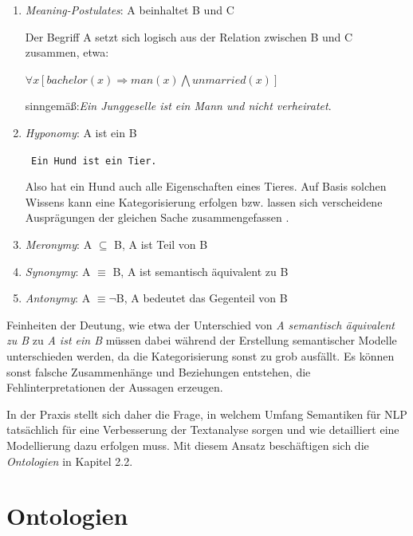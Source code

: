 \documentclass[12pt]{report}
\begin{document}
\begin{enumerate}
\item \textit{Meaning-Postulates}: A beinhaltet B und C

Der Begriff A setzt sich logisch aus der Relation zwischen B und C zusammen, etwa:

$\forall x[bachelor(x)\Rightarrow man(x)\bigwedge unmarried(x)]$

sinngemäß:\glqq \textit{Ein Junggeselle ist ein Mann und nicht verheiratet}.\grqq

\item \textit{Hyponomy}: A ist ein B

\tt
Ein Hund ist ein Tier. 
\rm

Also hat ein Hund auch alle Eigenschaften eines Tieres. Auf Basis solchen Wissens kann eine Kategorisierung erfolgen bzw. lassen sich verscheidene Ausprägungen der gleichen Sache zusammengefassen \cite{rs18}.

\item \textit{Meronymy}: A $\subseteq$ B, A ist Teil von B

\item \textit{Synonymy}: A $\equiv$ B, A ist semantisch äquivalent zu B

\item \textit{Antonymy}: A $\equiv \neg$B, A bedeutet das Gegenteil von B
\end{enumerate}

Feinheiten der Deutung, wie etwa der Unterschied von \glqq \textit{A semantisch äquivalent zu B}\grqq{} zu \glqq \textit{A ist ein B}\grqq{} müssen dabei während der Erstellung semantischer Modelle unterschieden werden, da die Kategorisierung sonst zu grob ausfällt. Es können sonst falsche Zusammenhänge und Beziehungen entstehen, die Fehlinterpretationen der Aussagen erzeugen.

In der Praxis stellt sich daher die Frage, in welchem Umfang Semantiken für NLP tatsächlich für eine Verbesserung der Textanalyse sorgen und wie detailliert eine Modellierung dazu erfolgen muss. Mit diesem Ansatz beschäftigen sich die \textit{Ontologien} in Kapitel 2.2.

\subsubsection{}

\section{Ontologien}
\end{document}
